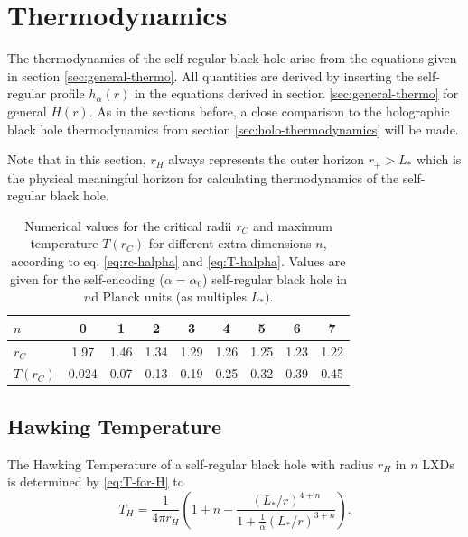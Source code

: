 \documentclass[12pt,a4paper]{report}
\numberwithin{equation}{chapter}
\begin{document}
\clearpage
\section{Thermodynamics}
The thermodynamics of the self-regular black hole arise from the equations given in section \ref{sec:general-thermo}. All quantities are derived by inserting the self-regular profile $h_\alpha(r)$ in the equations derived in section \ref{sec:general-thermo} for general $H(r)$. As in the sections before, a close comparison to the holographic black hole thermodynamics from section \ref{sec:holo-thermodynamics} will be made.

Note that in this section, $r_H$ always represents the outer horizon $r_+ > L_*$ which is the physical meaningful horizon for calculating thermodynamics of the self-regular black hole.


\begin{table}[h!]
\begin{center}
\begin{tabular}{lcccccccc}
\firsthline
 $n$ & 0 & 1 & 2 & 3 & 4 & 5 & 6 & 7 \\
   \hline
 $r_{C}$ & 1.97 & 1.46 & 1.34 & 1.29 & 1.26 & 1.25 & 1.23 & 1.22 \\
  $T(r_{C})$ & 0.024 & 0.07 & 0.13 & 0.19 & 0.25 & 0.32 & 0.39 & 0.45 \\   
   \hline
\end{tabular}
\end{center}
\caption[Critical radii and maximum temperatures for the self-regular black hole]{Numerical values for the critical radii $r_C$ and maximum temperature $T(r_C)$ for different extra dimensions $n$, according to eq. \eqref{eq:rc-halpha} and \eqref{eq:T-halpha}. Values are given for the self-encoding ($\alpha=\alpha_0$) self-regular black hole in $n$d Planck units (as multiples $L_*$).}\label{table:critical-r}
\end{table}

%
\subsection{Hawking Temperature}
The Hawking Temperature of a self-regular black hole with radius $r_H$ in $n$ LXDs is determined by \eqref{eq:T-for-H} to
%
\begin{equation}\label{eq:T-halpha}
T_H =
\frac{1}{4\pi r_H}
\left(
1 + n - 
\frac{(L_*/r)^{4+n}}{1 + \frac 1\alpha (L_*/r)^{3+n}}
\right).
\end{equation}
\end{document}
